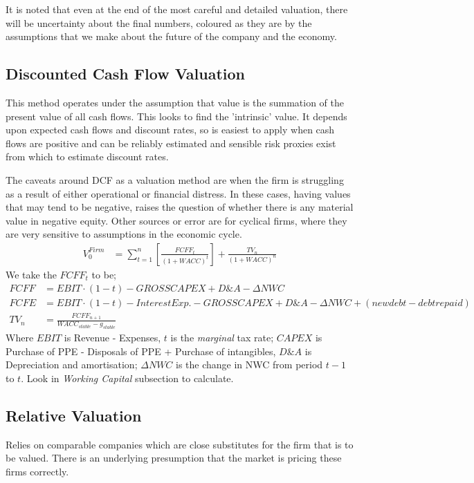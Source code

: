 \documentclass[a4paper]{article}
\begin{document}
It is noted that even at the end of the most careful and detailed valuation,
there will be uncertainty about the final numbers, coloured as they are by the
assumptions that we make about the future of the company and the economy.

\subsection{Discounted Cash Flow Valuation}
This method operates under the assumption that value is the summation
of the present value of all cash flows. This looks to find the 'intrinsic' value.
It depends upon expected cash flows and discount rates, so is easiest to apply
when cash flows are positive and can be reliably estimated and sensible risk
proxies exist from which to estimate discount rates.

The caveats around
DCF as a valuation method are when the firm is struggling as a result of
either operational or financial distress. In these cases, having values that
may tend to be negative, raises the question of whether there is any material
value in negative equity. Other sources or error are for cyclical firms, where
they are very sensitive to assumptions in the economic cycle.
\begin{align*}
V_0^{Firm} &= \sum^n_{t=1}[\frac{FCFF_t}{(1 + WACC)^t}] + \frac{TV_n}{(1 + WACC)^n}
\end{align*}
We take the $FCFF_t$ to be; 
\begin{align*}
FCFF &= EBIT \cdot (1-t) - GROSS CAPEX + D\&A - \Delta NWC\\
FCFE &= EBIT \cdot (1-t) - Interest Exp. - GROSS CAPEX + D\&A - \Delta NWC + (new debt - debt repaid)\\
TV_n &= \frac{FCFF_{n+1}}{WACC_{stable} - g_{stable}}
\end{align*}
Where $EBIT$ is Revenue - Expenses, $t$ is the \emph{marginal} tax rate;
$CAPEX$ is Purchase of PPE - Disposals of PPE + Purchase of intangibles, $D\&A$
is Depreciation and amortisation; $\Delta NWC$ is the change in NWC from
period $t-1$ to $t$. Look in \emph{Working Capital} subsection to calculate.

\subsection{Relative Valuation}
Relies on comparable companies which are close substitutes for the firm that
is to be valued. There is an underlying presumption that the market is pricing
these firms correctly.
\end{document}
